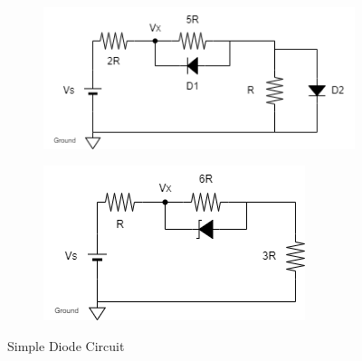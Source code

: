 \begin{figure}[H]
            \begin{subfigure}{0.4\textwidth}
                \includegraphics[width=1\linewidth]{Experiment_01/Circuit/Lab1c.png}
                \caption{ }
                \label{cir:1c}
            \end{subfigure}
            \begin{subfigure}{0.4\textwidth}
                \includegraphics[width=1\linewidth]{Experiment_01/Circuit/Lab1d.png}
                \caption{ }
                \label{cir:1d}
            \end{subfigure}
            \caption{Simple Diode Circuit}
        \end{figure}


